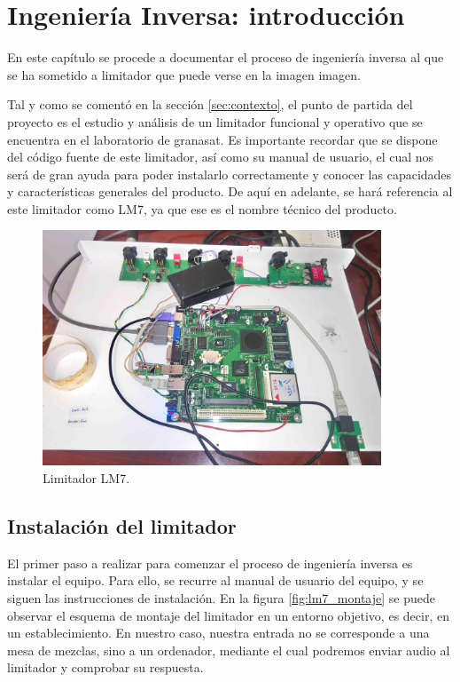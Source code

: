 \chapter{Ingeniería Inversa: introducción} \label{cap:capitulo3_I}

En este capítulo se procede a documentar el proceso de ingeniería inversa al que se ha sometido a limitador que puede verse en la imagen {imagen}.

Tal y como se comentó en la sección \ref{sec:contexto}, el punto de partida del proyecto es el estudio y análisis de un limitador funcional y operativo que se encuentra en el laboratorio de \gls{granasat}. Es importante recordar que se dispone del código fuente de este limitador, así como su manual de usuario, el cual nos será de gran ayuda para poder instalarlo correctamente y conocer las capacidades y características generales del producto. De aquí en adelante, se hará referencia al este limitador como \acrshort{LM7}, ya que ese es el nombre técnico del producto.

\begin{figure}
    \centering
    \includegraphics[width=0.9\textwidth]{imagenes/lm7-fotos/lms7.jpg}
    \caption{Limitador LM7.}
	\label{img:lms7_cls}
\end{figure}

\section{Instalación del limitador}

El primer paso a realizar para comenzar el proceso de ingeniería inversa es instalar el equipo. Para ello, se recurre al manual de usuario del equipo, y se siguen las instrucciones de instalación. En la figura \ref{fig:lm7_montaje} se puede observar el esquema de montaje del limitador en un entorno objetivo, es decir, en un establecimiento. En nuestro caso, nuestra entrada no se corresponde a una mesa de mezclas, sino a un ordenador, mediante el cual podremos enviar audio al limitador y comprobar su respuesta.

